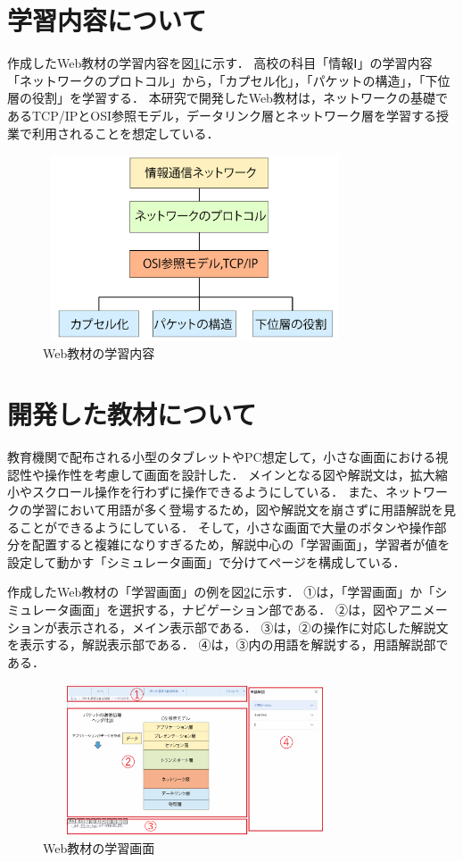 \documentclass[twocolumn,10pt,a4j]{ltjsarticle}
\begin{document}
\section{学習内容について}
作成したWeb教材の学習内容を図\ref{fig:内容}に示す．
高校の科目「情報Ⅰ」の学習内容「ネットワークのプロトコル」から，「カプセル化」，「パケットの構造」，「下位層の役割」を学習する．
本研究で開発したWeb教材は，ネットワークの基礎であるTCP/IPとOSI参照モデル，データリンク層とネットワーク層を学習する授業で利用されることを想定している．
\begin{figure}[h]
\begin{center}
 \includegraphics[clip,width=90mm,height=55mm]{figures/naiyou.pdf}
\end{center}
 \caption{Web教材の学習内容}
 \label{fig:内容}
\end{figure}
\section{開発した教材について}
教育機関で配布される小型のタブレットやPC想定して，小さな画面における視認性や操作性を考慮して画面を設計した．
メインとなる図や解説文は，拡大縮小やスクロール操作を行わずに操作できるようにしている．
また、ネットワークの学習において用語が多く登場するため，図や解説文を崩さずに用語解説を見ることができるようにしている．
そして，小さな画面で大量のボタンや操作部分を配置すると複雑になりすぎるため，解説中心の「学習画面」，学習者が値を設定して動かす「シミュレータ画面」で分けてページを構成している．

作成したWeb教材の「学習画面」の例を図\ref{fig:画面}に示す．
①は，「学習画面」か「シミュレータ画面」を選択する，ナビゲーション部である．
②は，図やアニメーションが表示される，メイン表示部である．
③は，②の操作に対応した解説文を表示する，解説表示部である．
④は，③内の用語を解説する，用語解説部である．

\begin{figure}[h]
\begin{center}
 \includegraphics[clip,width=90mm,height=45mm]{figures/gamen.pdf}
\end{center}
 \caption{Web教材の学習画面}
 \label{fig:画面}
\end{figure}
\end{document}

